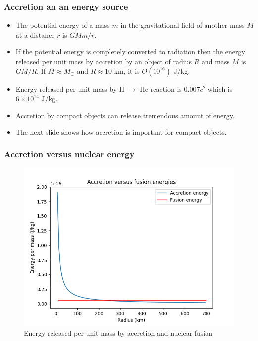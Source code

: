 \documentclass{beamer}
\begin{document}
\begin{frame}
\frametitle{Accretion an an energy source}
\begin{itemize}
\item The potential energy of a mass $m$ in the gravitational field of another mass $M$ at a distance $r$ is $GMm/r$.
\item If the potential energy is completely converted to radiation then the energy released per unit mass by accretion by an object 
of radius $R$ and mass $M$ is $GM/R$. If $M \approx M_\odot$ and $R \approx 10$ km, it is $O(10^{16})$ J/kg.
\item Energy released per unit mass by H $\rightarrow$ He reaction is $0.007 c^2$ which is $6 \times 10^{14}$ J/kg.
\item Accretion by compact objects can release tremendous amount of energy. 
\item The next slide shows how accretion is important for compact objects.
\end{itemize}
\end{frame}

\begin{frame}
\frametitle{Accretion versus nuclear energy}
\begin{figure}
\includegraphics[scale=0.5]{Figure_1.png}
\caption{Energy released per unit mass by accretion and nuclear fusion}
\label{f1}
\end{figure}
\end{frame}
\end{document}
